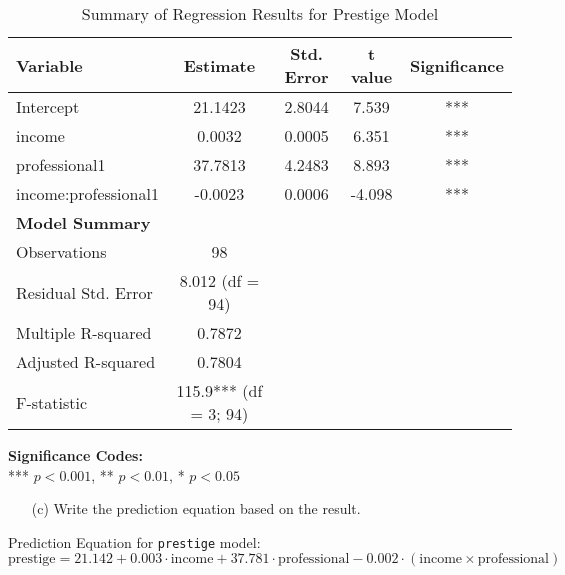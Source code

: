 \documentclass[12pt,letterpaper]{article}
\begin{document}
\newpage
\begin{table}[h!]
	\centering
	\caption{Summary of Regression Results for Prestige Model}
	\vspace{0.25cm}
	\begin{tabular}{lcccc}
		\toprule
		\textbf{Variable} & \textbf{Estimate} & \textbf{Std. Error} & \textbf{t value} & \textbf{Significance} \\ 
		\midrule
		Intercept              & 21.1423 & 2.8044 & 7.539 & *** \\ 
		income                 & 0.0032  & 0.0005 & 6.351 & *** \\ 
		professional1          & 37.7813 & 4.2483 & 8.893 & *** \\ 
		income:professional1    & -0.0023 & 0.0006 & -4.098 & *** \\ 
		\midrule
		\textbf{Model Summary} & & & & \\
		Observations		   & 98 & & & \\
		Residual Std. Error    & 8.012 (df = 94)  & & & \\ 
		Multiple R-squared     & 0.7872  & & & \\ 
		Adjusted R-squared     & 0.7804  & & & \\ 
		F-statistic            & 115.9*** (df = 3; 94) & & & \\
		\bottomrule
	\end{tabular}
\end{table}

\vspace{0.1cm}
\noindent\textbf{Significance Codes:} \\
*** $p < 0.001$, ** $p < 0.01$, * $p < 0.05$

\vspace{0.5cm}
\begin{enumerate}
	\item [(c)]
	Write the prediction equation based on the result.
\end{enumerate}

\noindent Prediction Equation for \texttt{prestige} model: 
\[\text{prestige} = 21.142 + 0.003 \cdot \text{income} + 37.781 \cdot \text{professional} - 0.002 \cdot (\text{income} \times \text{professional})\]
\end{document}
